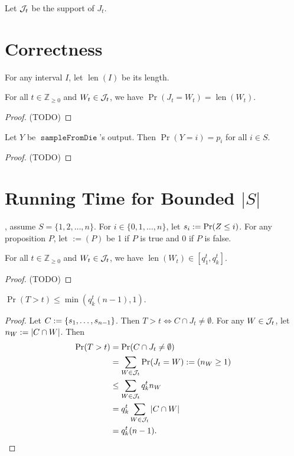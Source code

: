 \documentclass[a4paper, 12pt, fleqn]{article}
\DeclareMathOperator{\sampleFromDie}{\mathtt{sampleFromDie}}
\DeclareMathOperator{\len}{len}
\newcommand*{\boolone}{:=}
\begin{document}
Let $\mathcal{J}_t$ be the support of $J_t$.

\section{Correctness}

For any interval $I$, let $\len(I)$ be its length.

\begin{lemma}
For all $t \in \mathbb{Z}_{\ge 0}$ and $W_t \in \mathcal{J}_t$, we have $\Pr(J_t = W_t) = \len(W_t)$.
\end{lemma}
\begin{proof}
(TODO)
\end{proof}

\begin{theorem}
Let $Y$ be $\sampleFromDie$'s output. Then $\Pr(Y = i) = p_i$ for all $i \in S$.
\end{theorem}
\begin{proof}
(TODO)
\end{proof}

\section{Running Time for Bounded \texorpdfstring{$|S|$}{|S|}}

\WLoG{}, assume $S = \{1, 2, \ldots, n\}$.
For $i \in \{0, 1, \ldots, n\}$, let $s_i := \Pr(Z \le i)$.
For any proposition $P$, let $\boolone(P)$ be 1 if $P$ is true and 0 if $P$ is false.

\begin{lemma}
For all $t \in \mathbb{Z}_{\ge 0}$ and $W_t \in \mathcal{J}_t$, we have $\len(W_t) \in [q_1^t, q_k^t]$.
\end{lemma}
\begin{proof}
(TODO)
\end{proof}

\begin{lemma}
$\Pr(T > t) \le \min(q_k^t(n-1), 1)$.
\end{lemma}
\begin{proof}
Let $C := \{s_1, \ldots, s_{n-1}\}$.
Then $T > t \iff C \cap J_t \neq \emptyset$.
For any $W \in \mathcal{J}_t$, let $n_W := |C \cap W|$. Then
\begin{align*}
\Pr(T > t) &= \Pr(C \cap J_t \neq \emptyset)
\\ &= \sum_{W \in \Jcal_t} \Pr(J_t = W)\boolone(n_W \ge 1)
\\ &\le \sum_{W \in \Jcal_t} q_k^t n_W
\\ &= q_k^t \sum_{W \in \Jcal_t} |C \cap W|
\\ &= q_k^t (n-1).
\qedhere \end{align*}
\end{proof}
\end{document}
